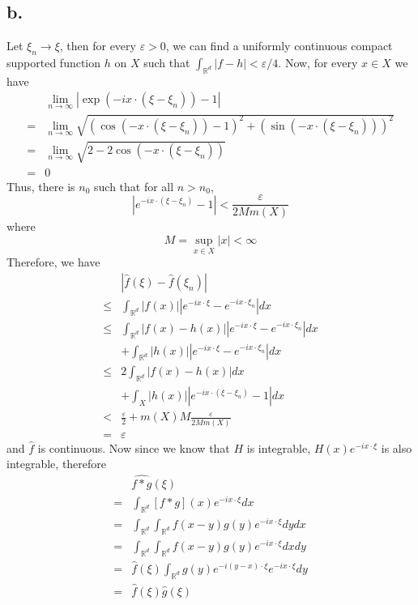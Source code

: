 \documentclass[11pt]{article}
\theoremstyle{mystyle}
\theoremstyle{definition}
\begin{document}
\subsection*{b.}
Let $\xi_n \to \xi$, then for every $\varepsilon > 0$, we can find a uniformly continuous compact supported function $h$ on $X$ such that $\int_{\mathbb{R}^d} |f-h| < \varepsilon/4$.  
Now, for every $x \in X$ we have 
\begin{align*}
  &\lim_{n \to \infty} |\exp(-ix \cdot (\xi - \xi_n)) - 1| \\
  =& \lim_{n \to \infty}\sqrt{\left(\cos(- x \cdot (\xi - \xi_n)) -1 \right)^2 + \left(\sin(-x \cdot (\xi-\xi_n))\right)^2 } \\
  =& \lim_{n \to \infty} \sqrt{2 - 2 \cos(-x \cdot (\xi-\xi_n)) } \\
  =& 0
\end{align*}
Thus, there is $n_0$ such that for all $n > n_0$, 
\[
  |e^{-ix \cdot (\xi - \xi_n)} - 1| < \displaystyle\frac{\varepsilon}{2Mm(X)}
\]
where 
\[
  M = \sup_{x \in X} |x| < \infty
\]
Therefore, we have
\begin{align*}
  &| \widehat f(\xi) - \widehat f(\xi_n)| \\
  \le &\int_{\mathbb{R}^d} |f(x)| |e^{-ix \cdot \xi} - e^{-ix \cdot \xi_n} | dx \\
  \le &\int_{\mathbb{R}^d} |f(x) - h(x)| |e^{-ix \cdot \xi} - e^{-ix \cdot \xi_n} | dx \\ 
  &+ \int_{\mathbb{R}^d} |h(x)| |e^{-ix \cdot \xi} - e^{-ix \cdot \xi_n} | dx \\
  \le &2\int_{\mathbb{R}^d} |f(x) - h(x)| dx \\ 
  &+ \int_X |h(x)|  |e^{-ix \cdot (\xi-\xi_n)} - 1 |  dx \\
  < & \displaystyle\frac{\varepsilon}{2} + m(X) M \displaystyle\frac{\varepsilon}{2M m(X)} \\
  =& \varepsilon
\end{align*}
and $\widehat f$ is continuous.
Now since we know that $H$ is integrable, $H(x) e^{-ix \cdot \xi}$ is also integrable, therefore 
\begin{align*}
  &\widehat{f * g}(\xi) \\
  =& \int_{\mathbb{R}^d} [f*g](x) e^{-ix \cdot \xi} dx \\
  =& \int_{\mathbb{R}^d} \int_{\mathbb{R}^d} f(x-y)g(y) e^{-ix \cdot \xi} dy dx \\
  =& \int_{\mathbb{R}^d} \int_{\mathbb{R}^d} f(x-y)g(y) e^{-ix \cdot \xi} dx dy \\
  =& \widehat f(\xi)\int_{\mathbb{R}^d} g(y) e^{-i(y-x) \cdot \xi} e^{-ix \cdot \xi} dy \\
  =& \widehat f(\xi) \widehat g(\xi)
\end{align*}
\end{document}
